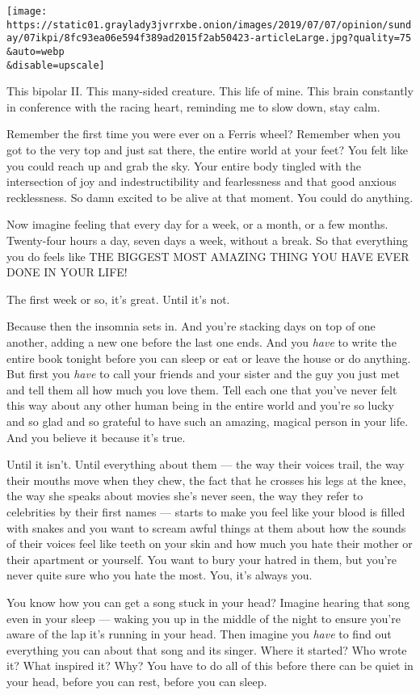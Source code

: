 \texttt{[image: https://static01.graylady3jvrrxbe.onion/images/2019/07/07/opinion/sunday/07ikpi/8fc93ea06e594f389ad2015f2ab50423-articleLarge.jpg?quality=75\\\&auto=webp\\\&disable=upscale]}

This bipolar II. This many-sided creature. This life of mine. This brain
constantly in conference with the racing heart, reminding me to slow
down, stay calm.

Remember the first time you were ever on a Ferris wheel? Remember when
you got to the very top and just sat there, the entire world at your
feet? You felt like you could reach up and grab the sky. Your entire
body tingled with the intersection of joy and indestructibility and
fearlessness and that good anxious recklessness. So damn excited to be
alive at that moment. You could do anything.

Now imagine feeling that every day for a week, or a month, or a few
months. Twenty-four hours a day, seven days a week, without a break. So
that everything you do feels like THE BIGGEST MOST AMAZING THING YOU
HAVE EVER DONE IN YOUR LIFE!

The first week or so, it's great. Until it's not.

Because then the insomnia sets in. And you're stacking days on top of
one another, adding a new one before the last one ends. And you
\emph{have} to write the entire book tonight before you can sleep or eat
or leave the house or do anything. But first you \emph{have} to call
your friends and your sister and the guy you just met and tell them all
how much you love them. Tell each one that you've never felt this way
about any other human being in the entire world and you're so lucky and
so glad and so grateful to have such an amazing, magical person in your
life. And you believe it because it's true.

Until it isn't. Until everything about them --- the way their voices
trail, the way their mouths move when they chew, the fact that he
crosses his legs at the knee, the way she speaks about movies she's
never seen, the way they refer to celebrities by their first names ---
starts to make you feel like your blood is filled with snakes and you
want to scream awful things at them about how the sounds of their voices
feel like teeth on your skin and how much you hate their mother or their
apartment or yourself. You want to bury your hatred in them, but you're
never quite sure who you hate the most. You, it's always you.

You know how you can get a song stuck in your head? Imagine hearing that
song even in your sleep --- waking you up in the middle of the night to
ensure you're aware of the lap it's running in your head. Then imagine
you \emph{have} to find out everything you can about that song and its
singer. Where it started? Who wrote it? What inspired it? Why? You have
to do all of this before there can be quiet in your head, before you can
rest, before you can sleep.

